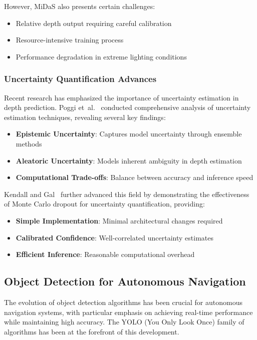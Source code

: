 \documentclass[12pt,oneside]{book}
\begin{document}
However, MiDaS also presents certain challenges:
\begin{itemize}
    \item Relative depth output requiring careful calibration
    \item Resource-intensive training process
    \item Performance degradation in extreme lighting conditions
\end{itemize}

\subsubsection{Uncertainty Quantification Advances}
Recent research has emphasized the importance of uncertainty estimation in depth prediction. Poggi et~al.~\cite{poggi2020uncertainty} conducted comprehensive analysis of uncertainty estimation techniques, revealing several key findings:

\begin{itemize}
    \item \textbf{Epistemic Uncertainty}: Captures model uncertainty through ensemble methods
    \item \textbf{Aleatoric Uncertainty}: Models inherent ambiguity in depth estimation
    \item \textbf{Computational Trade-offs}: Balance between accuracy and inference speed
\end{itemize}

Kendall and Gal~\cite{kendall2017uncertainties} further advanced this field by demonstrating the effectiveness of Monte Carlo dropout for uncertainty quantification, providing:

\begin{itemize}
    \item \textbf{Simple Implementation}: Minimal architectural changes required
    \item \textbf{Calibrated Confidence}: Well-correlated uncertainty estimates
    \item \textbf{Efficient Inference}: Reasonable computational overhead
\end{itemize}

\subsection{Object Detection for Autonomous Navigation}

The evolution of object detection algorithms has been crucial for autonomous navigation systems, with particular emphasis on achieving real-time performance while maintaining high accuracy. The YOLO (You Only Look Once) family of algorithms has been at the forefront of this development.
\end{document}
